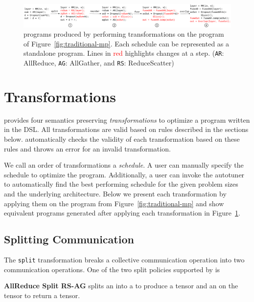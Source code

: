 \begin{figure}[t]
	\centering
  \includegraphics[width=\linewidth]{figures/coconet-example.pdf}
  \caption{\tool programs produced by performing transformations on the program of Figure~\ref{fig:traditional-mp}. Each schedule can be represented as a standalone program. Lines in \textcolor{red}{red} highlights changes at a step. (\texttt{AR}: AllReduce, \texttt{AG}: AllGather, and \texttt{RS}: ReduceScatter)
  	\label{fig:mp-schedules}}
    \vspace{-1em}
\end{figure}

\section{\tool Transformations}
\label{sec:schedule}
\tool provides four semantics preserving \emph{transformations} to optimize a program written in the DSL.
All transformations are valid based on rules described in the sections below. 
\tool automatically checks the validity of each transformation based on these rules and throws an error for  an invalid transformation.

We call an order of transformations a \emph{schedule}.
A user can manually specify the schedule to optimize the program.
Additionally, a user can invoke the autotuner to automatically find the best performing schedule for the given problem sizes and the underlying architecture.
Below we present each transformation by applying them on the program from Figure~\ref{fig:traditional-mp} and show equivalent \tool{} programs generated after applying each transformation in Figure~\ref{fig:mp-schedules}.

\subsection{Splitting Communication}
The \texttt{split} transformation breaks a collective communication operation into two communication operations.
One of the two split policies supported by \tool is

\textbf{AllReduce Split RS-AG} splits an \allreduce into a \reducescatter to produce a \sliced tensor and an \allgather on the \sliced tensor to return a \replicated tensor.

